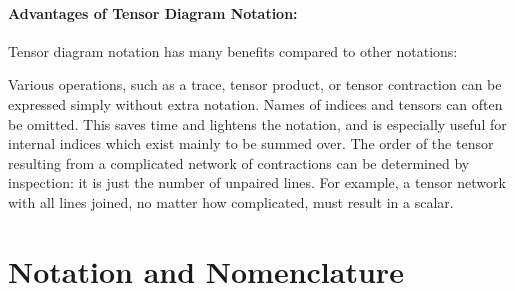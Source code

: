 \paragraph{Advantages of Tensor Diagram Notation:}
Tensor diagram notation has many benefits compared to other notations:

Various operations, such as a trace, tensor product, or tensor contraction can be expressed simply without extra notation.
Names of indices and tensors can often be omitted. This saves time and lightens the notation, and is especially useful for internal indices which exist mainly to be summed over.
The order of the tensor resulting from a complicated network of contractions can be determined by inspection: it is just the number of unpaired lines. For example, a tensor network with all lines joined, no matter how complicated, must result in a scalar.

\tableofcontents

\section{Notation and Nomenclature}

\newenvironment{compress}{
  \renewcommand{\arraystretch}{0.6} %
  \setlength{\arraycolsep}{2pt}     %
  \vspace{.3em}
}{
  \vspace{.3em}
  \renewcommand{\arraystretch}{1}   %
  \setlength{\arraycolsep}{5pt}     %
}

